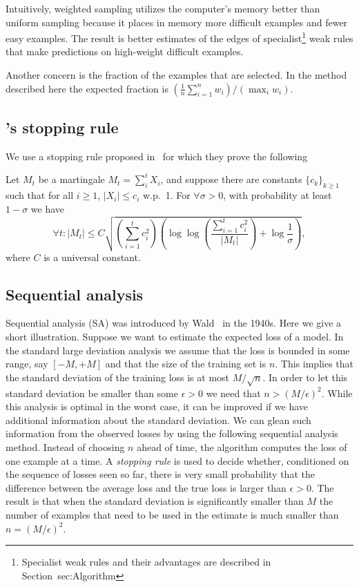 Intuitively, weighted sampling utilizes the computer's memory better
than uniform sampling because it places in memory more difficult
examples and fewer easy examples. The result is better estimates of
the edges of specialist\footnote{Specialist weak rules and their
  advantages are described in Section~{sec:Algorithm}} weak rules that
make predictions on high-weight difficult examples.


Another concern is the fraction of the examples that are selected. In
the method described here the expected fraction is $(\frac{1}{n}
\sum_{i=1}^n w_i)/(\max_i w_i)$.

\subsection{\Sparrow's stopping rule} \label{sec:balsubramani}

We use a stopping rule proposed in~\cite{balsubramani_sharp_2014}
for which they prove the following

\begin{theorem} \label{thm:balsubramani}
  Let $M_t$ be a martingale $M_t = \sum_i^t X_i$,
  and suppose there are constants $\{c_k\}_{k \geq 1}$ such that
  for all $i \geq 1$, $|X_i| \leq c_i$ w.p.\ 1.
  For $\forall \sigma > 0$, with probability at least $1 - \sigma$ we have
  \[
  \forall t: |M_t| \leq C \sqrt{
    \left( \sum_{i=1}^t c_i^2 \right)
    \left( \log \log \left( \frac{ \sum_{i=1}^t c_i^2 }{ |M_t| }\right) +
    \log \frac{1}{\sigma} \right)
  },
  \]
  where $C$ is a universal constant.
\end{theorem}

\subsection{Sequential analysis}
Sequential analysis (SA) was introduced by
Wald~\cite{wald_sequential_1973} in the 1940s.  Here we give a short
illustration. Suppose we want to estimate the expected loss of a
model. In the standard large deviation analysis we assume that the
loss is bounded in some range, say $[-M,+M]$ and that the size of the
training set is $n$. This implies that the standard deviation of the
training loss is at most $M/\sqrt{n}$. In order to let this standard
deviation be smaller than some $\epsilon>0$ we need that
$n > (M/\epsilon)^2$. While this analysis is optimal in the worst case, it
can be improved if we have additional information about the standard
deviation. We can glean such information from the observed losses by
using the following sequential analysis method. Instead of choosing
$n$ ahead of time, the algorithm computes the loss of one example at a
time. A {\em stopping rule} is used to decide whether, conditioned on
the sequence of losses seen so far, there is very small probability
that the difference between the average loss and the true loss is
larger than $\epsilon>0$. The result is that when the standard
deviation is significantly smaller than $M$ the number of examples
that need to be used in the estimate is much smaller than
$n=(M/\epsilon)^2$.

